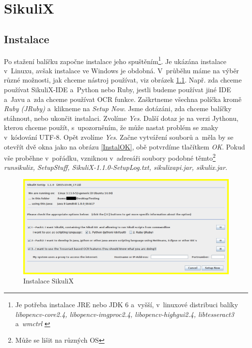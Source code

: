 \chapter{SikuliX}
	\section{Instalace}
	Po stažení balíčku započne instalace jeho spuštěním\footnote{Je potřeba instalace JRE nebo JDK 6 a~vyšší, v~linuxové distribuci balíky \emph{libopencv-core2.4, libopencv-imgproc2.4, libopencv-highgui2.4, libtesseract3} a~\emph{wmctrl} \citep{SikuliX}}. Je ukázána instalace v~Linuxu, avšak instalace ve Windows je obdobná. V~průběhu máme na výběr různé možnosti, jak chceme nástroj používat, viz obrázek \ref{Instal}. Např. zda chceme používat SikuliX-IDE a~Python nebo Ruby, jestli budeme používat jiné IDE a~Javu a~zda chceme používat OCR funkce. Zaškrtneme všechna políčka kromě \emph{Ruby (JRuby)} a~klikneme na \emph{Setup Now}. Jsme dotázáni, zda chceme balíčky stáhnout, nebo ukončit instalaci. Zvolíme \emph{Yes}. Další dotaz je na verzi Jythonu, kterou chceme použít, s~upozorněním, že může nastat problém se znaky v~kódování UTF-8. Opět zvolíme \emph{Yes}. Začne vytváření souborů a~měla by se otevřít dvě okna jako na obrázu \ref{InstalOK}, obě potvrdíme tlačítkem \emph{OK}. Pokud vše proběhne v~pořádku, vzniknou v~adresáři soubory podobné těmto\footnote{Může se lišit na různých OS} \emph{runsikulix, SetupStuff, SikuliX-1.1.0-SetupLog.txt, sikulixapi.jar, sikulix.jar}.
	\begin{figure}[ht!]
		\centering
		\caption{Instalace SikuliX}
		\label{Instal}
		\includegraphics[width=13.5cm]{img/Instalace/Instalace.png}
	\end{figure}
